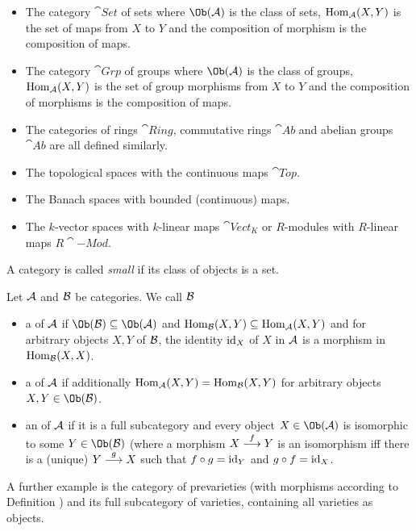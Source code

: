 \documentclass[a4paper,parskip=half,numbers=enddot, DIV=12]{scrreprt}
\begin{document}
\begin{example}
    \begin{itemize}
        \item 
            The category $\cat{Set}$ of sets where $\Ob(\Aa)$ is the class of sets, $\operatorname{Hom}_{\mathcal{A}}(X,Y)$ is the set of maps from $X$ to $Y$ and the composition of morphism is the composition of maps.
        \item 
            The category $\cat{Grp}$ of groups where $\Ob(\Aa)$ is the class of groups, $\operatorname{Hom}_{\mathcal{A}}(X,Y)$ is the set of group morphisms from $X$ to $Y$ and the composition of morphisms is the composition of maps.
        \item 
            The categories of rings $\cat{Ring}$, commutative rings $\cat{Ab}$ and abelian groups $\cat{Ab}$ are all defined similarly.
        \item 
            The topological spaces with the continuous maps $\cat{Top}$.
        \item 
            The Banach spaces with bounded (continuous) maps.
        \item 
            The $k$-vector spaces with $k$-linear maps $\cat{Vect}_K$ or $R$-modules with $R$-linear maps $R\cat{-Mod}$.
    \end{itemize}
\end{example}
A category is called \emph{small} if its class of objects is a set.

\begin{defi}
	Let $\mathcal{A}$ and $\mathcal{B}$ be categories. We call $\mathcal{B}$
	\begin{itemize}
		\item a  of $\mathcal{A}$ if $\Ob(\Bb) \subseteq \Ob(\Aa)$ and $\operatorname{Hom}_{\mathcal{B}}(X,Y) \subseteq \operatorname{Hom}_{\mathcal{A}}(X,Y)$ and for arbitrary objects $X,Y$ of $\mathcal{B}$, the identity $\operatorname{id}_X$ of $X$ in $\mathcal{A}$ is a morphism in $\operatorname{Hom}_{\mathcal{B}}(X,X)$.
		\item a  of $\mathcal{A}$ if additionally $\operatorname{Hom}_{\mathcal{A}}(X,Y) = \operatorname{Hom}_{\mathcal{B}}(X,Y)$ for arbitrary objects $X,Y\in\Ob(\Bb)$.
		\item an  of $\mathcal{A}$ if it is a full subcategory and every object $X\in \Ob(\Aa)$ is isomorphic to some $Y\in\Ob(\Bb)$ (where a morphism $X\morphism[f] Y$ is an isomorphism iff there  is a (unique) $Y\morphism[g] X$ such that $f\circ g = \operatorname{id}_Y$ and $g\circ f= \operatorname{id}_X$.
	\end{itemize}
\end{defi}

  A further example is the category of prevarieties (with morphisms according to Definition ) and its full subcategory of varieties, containing all varieties as objects.
  
\end{document}
